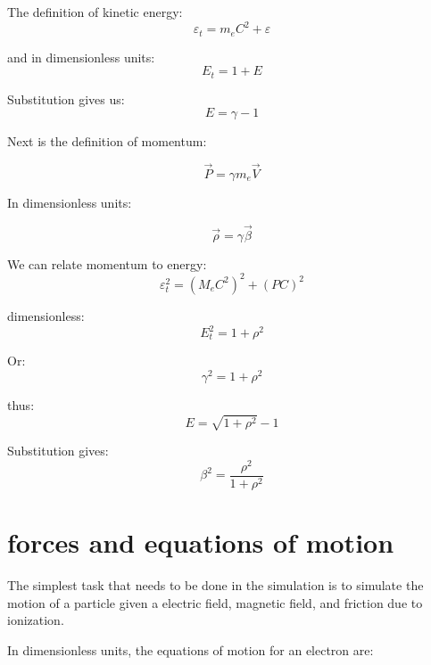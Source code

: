 \documentclass[]{article}
\begin{document}
The definition of kinetic energy:
\begin{equation}
\varepsilon_t = m_e C^2 + \varepsilon
\end{equation}

and in dimensionless units:
\begin{equation}
E_t = 1 + E
\end{equation}

Substitution gives us:
\begin{equation}
E=\gamma-1
\end{equation}

Next is the definition of momentum:

\begin{equation}
\vec{P} = \gamma m_e \vec{V}
\end{equation}

In dimensionless units:

\begin{equation}
\vec{\rho}= \gamma \vec{\beta}
\end{equation}

We can relate momentum to energy:
\begin{equation}
\varepsilon_t^2=(M_eC^2)^2 + (PC)^2
\end{equation}

dimensionless:
\begin{equation}
E_t^2=1+\rho^2
\end{equation}

Or:
\begin{equation}
\gamma^2=1+\rho^2
\end{equation}

thus:
\begin{equation}
E=\sqrt{1+\rho^2}-1
\end{equation}

Substitution gives:
\begin{equation}
\beta^2=\frac{\rho^2}{1+\rho^2}
\end{equation}


\section{forces and equations of motion}

The simplest task that needs to be done in the simulation is to simulate the motion of a particle given a electric field, magnetic field, and friction due to ionization.

In dimensionless units, the equations of motion for an electron are:
\end{document}
